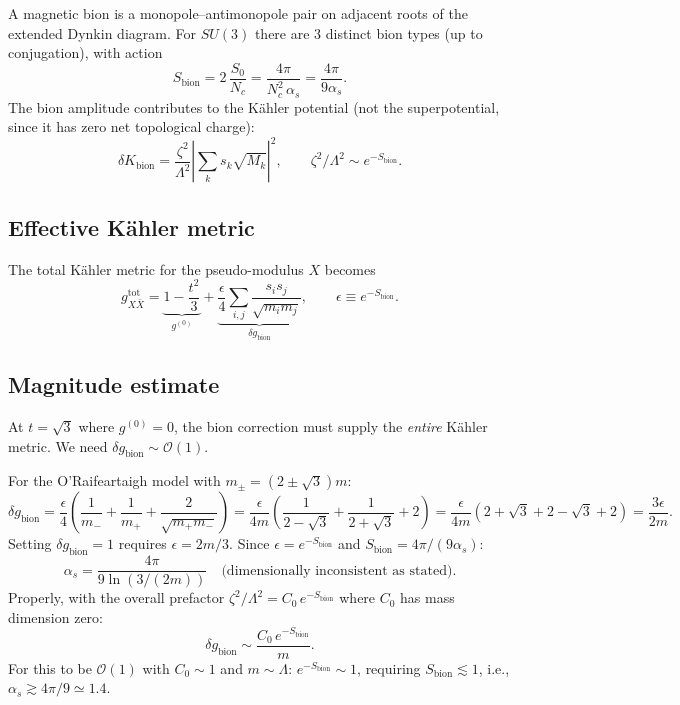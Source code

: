 A magnetic bion is a monopole--antimonopole pair on adjacent roots of the
extended Dynkin diagram.
For $SU(3)$ there are 3 distinct bion types (up to conjugation),
with action
\begin{equation}
S_{\text{bion}} = 2\,\frac{S_0}{N_c} = \frac{4\pi}{N_c^2\,\alpha_s}
= \frac{4\pi}{9\alpha_s}.
\end{equation}
The bion amplitude contributes to the K\"ahler potential (not the superpotential,
since it has zero net topological charge):
\begin{equation}
\delta K_{\text{bion}} = \frac{\zeta^2}{\Lambda^2}\left|\sum_k s_k\sqrt{M_k}\right|^2,
\qquad \zeta^2/\Lambda^2 \sim e^{-S_{\text{bion}}}.
\end{equation}

\subsection{Effective K\"ahler metric}

The total K\"ahler metric for the pseudo-modulus $X$ becomes
\begin{equation}
g_{X\bar X}^{\text{tot}} = \underbrace{1 - \frac{t^2}{3}}_{g^{(0)}}
+ \underbrace{\frac{\epsilon}{4}\sum_{i,j}\frac{s_i s_j}{\sqrt{m_i m_j}}}_{\delta g_{\text{bion}}},
\qquad \epsilon \equiv e^{-S_{\text{bion}}}.
\end{equation}

\subsection{Magnitude estimate}

At $t = \sqrt{3}$ where $g^{(0)} = 0$, the bion correction must supply the
\emph{entire} K\"ahler metric. We need $\delta g_{\text{bion}} \sim \mathcal{O}(1)$.

For the O'Raifeartaigh model with $m_\pm = (2 \pm \sqrt{3})m$:
\begin{equation}
\delta g_{\text{bion}} = \frac{\epsilon}{4}\left(\frac{1}{m_-} + \frac{1}{m_+}
+ \frac{2}{\sqrt{m_+ m_-}}\right)
= \frac{\epsilon}{4m}\left(\frac{1}{2-\sqrt{3}} + \frac{1}{2+\sqrt{3}} + 2\right)
= \frac{\epsilon}{4m}(2+\sqrt{3} + 2-\sqrt{3} + 2)
= \frac{3\epsilon}{2m}.
\end{equation}
Setting $\delta g_{\text{bion}} = 1$ requires $\epsilon = 2m/3$.
Since $\epsilon = e^{-S_{\text{bion}}}$ and $S_{\text{bion}} = 4\pi/(9\alpha_s)$:
\begin{equation}
\alpha_s = \frac{4\pi}{9\ln(3/(2m))} \quad \text{(dimensionally inconsistent as stated)}.
\end{equation}
Properly, with the overall prefactor $\zeta^2/\Lambda^2 = C_0\,e^{-S_{\text{bion}}}$
where $C_0$ has mass dimension zero:
\begin{equation}
\delta g_{\text{bion}} \sim \frac{C_0\,e^{-S_{\text{bion}}}}{m}.
\end{equation}
For this to be $\mathcal{O}(1)$ with $C_0 \sim 1$ and $m \sim \Lambda$:
$e^{-S_{\text{bion}}} \sim 1$, requiring $S_{\text{bion}} \lesssim 1$,
i.e., $\alpha_s \gtrsim 4\pi/9 \simeq 1.4$.

